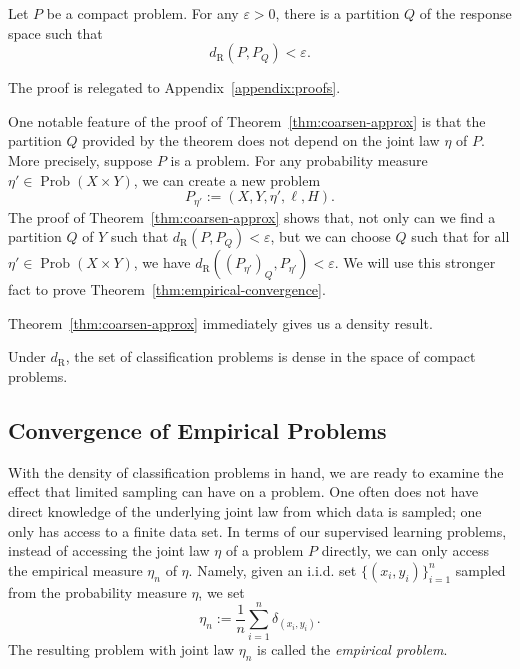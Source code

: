 \documentclass[twoside,11pt]{article}
\DeclareMathOperator{\prob}{Prob}
\newcommand{\dexp}[1][]{d_{\mathrm{R}#1}}
\renewcommand{\epsilon}{\varepsilon}
\begin{document}
    \begin{theorem}\label{thm:coarsen-approx}
    Let $P$ be a compact problem. For any
    $\epsilon>0$, there is a partition $Q$ of the response space such that
    \[\dexp(P,P_Q)<\epsilon.\]
    \end{theorem}
    The proof is relegated to Appendix~\ref{appendix:proofs}.
    \begin{remark}\label{remark:coarsening-distribution-independent}
        One notable feature of the proof of Theorem~\ref{thm:coarsen-approx} is that the partition $Q$ provided by the theorem does not depend on the joint law $\eta$ of $P$. More precisely, suppose $P$ is a problem. For any probability measure $\eta'\in \prob(X\times Y)$, we can create a new problem
        \[P_{\eta'} := (X,Y,\eta', \ell, H).\]
        The proof of Theorem~\ref{thm:coarsen-approx} shows that, not only can we find a partition $Q$ of $Y$ such that $\dexp(P,P_Q)<\epsilon$, but we can choose $Q$ such that for all $\eta'\in \prob(X\times Y)$, we have $\dexp((P_{\eta'})_Q,P_{\eta'})<\epsilon$. We will use this stronger fact to prove Theorem~\ref{thm:empirical-convergence}.
    \end{remark}

    Theorem~\ref{thm:coarsen-approx} immediately gives us a density result.

    \begin{corollary}\label{cor:finite-dense-in-compact}
    Under $\dexp$, the set of classification problems is dense in the space of compact problems.
    \end{corollary}

\subsection{Convergence of Empirical Problems}\label{subsec:empirical-convergence}
    With the density of classification problems in hand, we are ready to examine the effect that limited sampling can have on a problem. One often does not have direct knowledge of the underlying joint law from which data is sampled; one only has access to a finite data set. In terms of our supervised learning problems, instead of accessing the joint law $\eta$ of a problem $P$ directly, we can only access the empirical measure $\eta_n$ of $\eta$. Namely, given an i.i.d. set $\{(x_i,y_i)\}_{i=1}^n$ sampled from the probability measure $\eta$, we set $$\eta_n := \frac{1}{n}\sum_{i=1}^n \delta_{(x_i,y_i)}.$$
    The resulting problem with joint law $\eta_n$ is called the \emph{empirical problem}. 
\end{document}
